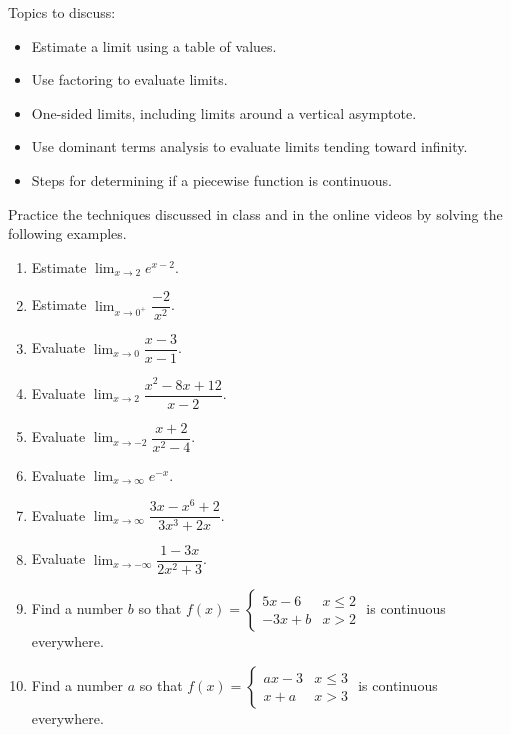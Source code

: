 \documentclass[10pt]{book}
\theoremstyle{definition}
\theoremstyle{remark}
\begin{document}
\begin{large}
\noindent
Topics to discuss:
\begin{itemize}
\item Estimate a limit using a table of values. 
\item Use factoring to evaluate limits. 
\item One-sided limits, including limits around a vertical asymptote.
\item Use dominant terms analysis to evaluate limits tending toward infinity.
\item Steps for determining if a piecewise function is continuous. 
\end{itemize}
\newpage

\noindent
Practice the techniques discussed in class and in the online videos by solving the following examples. 
\begin{enumerate}
\item Estimate $\displaystyle\lim_{x \rightarrow 2}e^{x-2}$.\vfil
\item Estimate $\displaystyle\lim_{x \rightarrow 0^+} \dfrac{-2}{x^2}$.\vfil\vfil
\item Evaluate $\displaystyle\lim_{x \rightarrow 0} \dfrac{x-3}{x-1}$. \vfil
\newpage

\item Evaluate $\displaystyle\lim_{x \rightarrow 2} \dfrac{x^{2} - 8x + 12}{x-2}$.\vfil\vfil
\item Evaluate $\displaystyle\lim_{x \rightarrow -2} \dfrac{x+2}{x^{2} - 4}$.\vfil
\newpage

\item Evaluate $\displaystyle\lim_{x \rightarrow \infty} e^{-x}$.\vfil
\item Evaluate $\displaystyle\lim_{x \rightarrow \infty} \dfrac{3x-x^6 + 2}{3x^3 + 2x}$.\vfil\vfil
\item Evaluate $\displaystyle\lim_{x \rightarrow -\infty} \dfrac{1-3x}{2x^2 + 3}$.\vfil
\newpage

\item Find a number $b$ so that $f(x) = \begin{cases} 5x - 6 & x \leq 2 \\ -3x + b & x > 2 \end{cases}$ is continuous everywhere. \vfil\vfil
\item Find a number $a$ so that $f(x) = \begin{cases} ax - 3 & x \leq 3 \\ x + a & x > 3 \end{cases}$ is continuous everywhere. \vfil
\newpage


\end{enumerate}
\end{large}
\end{document}
